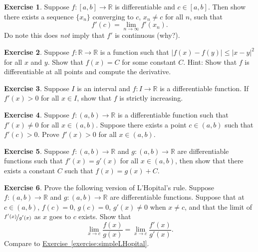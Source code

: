 \documentclass[12pt]{book}
\newcommand{\abs}[1]{\left\lvert {#1} \right\rvert}
\newcommand{\R}{{\mathbb{R}}}
\newcommand{\myindex}[1]{#1\index{#1}}
\theoremstyle{plain}
\theoremstyle{remark}
\theoremstyle{definition}
\theoremstyle{exercise}
\newtheorem{exercise}{Exercise}[section]
\theoremstyle{example}
\newcommand{\exerciseref}[1]{\hyperref[#1]{Exercise~\ref*{#1}}}
\begin{document}
\begin{exercise}
Suppose $f \colon [a,b] \to \R$ is differentiable and $c \in [a,b]$.
Then show there exists a sequence $\{ x_n \}$ converging to $c$, $x_n
\not= c$ for all $n$, such that
\begin{equation*}
f'(c) = \lim_{n\to \infty} f'(x_n).
\end{equation*}
Do note this does \emph{not} imply that $f'$ is continuous (why?).
\end{exercise}

\begin{exercise}
Suppose $f \colon \R \to \R$ is a function such that
$\abs{f(x)-f(y)} \leq \abs{x-y}^2$ for all $x$ and $y$.  Show that
$f(x) = C$ for some constant $C$.  Hint: Show that $f$ is differentiable
at all points and compute the derivative.
\end{exercise}

\begin{exercise} \label{exercise:posderincr}
Suppose $I$ is an interval and
$f \colon I \to \R$ is a differentiable function.
If $f'(x) > 0$ for all $x \in I$, show that $f$ is strictly increasing.
\end{exercise}

\begin{exercise}
Suppose $f \colon (a,b) \to \R$ is a differentiable function
such that
$f'(x) \not= 0$ for all $x \in (a,b)$.  Suppose there
exists
a point $c \in (a,b)$ such that $f'(c) > 0$.
Prove $f'(x) > 0$ for all $x \in (a,b)$.
\end{exercise}

\begin{exercise} \label{exercise:samediffconst}
Suppose $f \colon (a,b) \to \R$ and $g \colon (a,b) \to \R$ are
differentiable functions such that $f'(x) = g'(x)$ for all $x \in (a,b)$,
then show that there exists a constant $C$ such that $f(x) = g(x) + C$.
\end{exercise}

\begin{exercise}
Prove the following version of \myindex{L'Hopital's rule}.  Suppose 
$f \colon (a,b) \to \R$ and $g \colon (a,b) \to \R$ are differentiable
functions.  Suppose that at $c \in (a,b)$, $f(c) = 0$, $g(c)=0$,
$g'(x) \not= 0$ when $x \not= c$, and
that the limit of $\nicefrac{f'(x)}{g'(x)}$ as $x$ goes to $c$ exists.  Show that
\begin{equation*}
\lim_{x \to c} \frac{f(x)}{g(x)} = 
\lim_{x \to c} \frac{f'(x)}{g'(x)} .
\end{equation*}
Compare to \exerciseref{exercise:simpleLHopital}.
\end{exercise}
\end{document}
